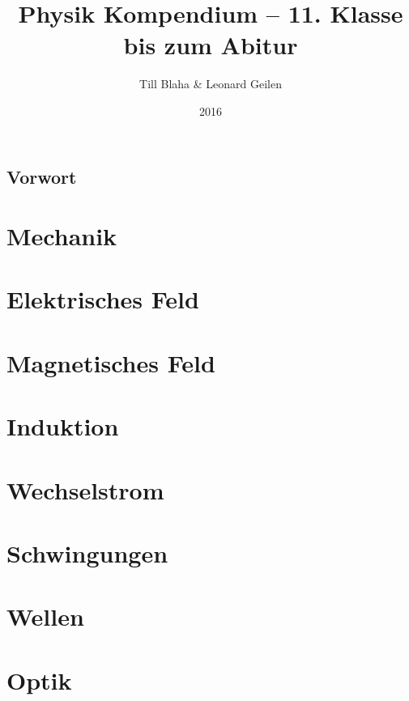 \documentclass[9pt, twopage]{book}
\title{Physik Kompendium -- 11. Klasse bis zum Abitur}
\author{Till Blaha \& Leonard Geilen}
\date{2016}
\begin{document}
\maketitle


\section*{\Huge Vorwort} \label{sec:Vorwort}


\tableofcontents
\newpage

\chapter{Mechanik} \label{ch:Mechanik}


\chapter{Elektrisches Feld} \label{ch:EFeld}


\chapter{Magnetisches Feld} \label{ch:MFeld}


\chapter{Induktion} \label{ch:Induktion}


\chapter{Wechselstrom} \label{ch:Wechselstrom}


\chapter{Schwingungen} \label{ch:Schwingungen}


\chapter{Wellen} \label{ch:Wellen}


\chapter{Optik} \label{ch:Optik}

\end{document}
